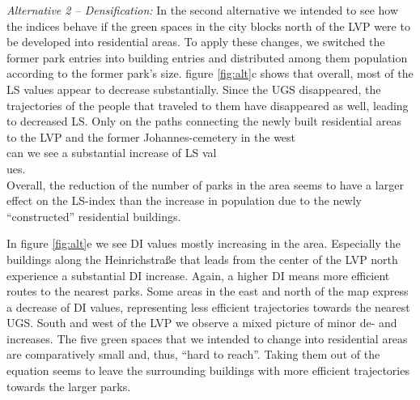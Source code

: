 \documentclass[10pt]{article}
\begin{document}
\textit{Alternative 2 – Densification:} In the second alternative we intended to see how the indices behave if the green spaces in the city blocks north of the LVP were to be developed into residential areas.
To apply these changes, we switched the former park entries into building entries and distributed among them population according to the former park’s size.
figure \ref{fig:alt}c shows that overall, most of the LS values appear to decrease substantially. 
Since the UGS disappeared, the trajectories of the people that traveled to them have disappeared as well, leading to decreased LS.
Only on the paths connecting the newly built residential areas to the LVP and the former Johannes-cemetery in the west\\
 can we see a substantial increase of LS val\\
 ues.\\
 
Overall, the reduction of the number of parks in the area seems to have a larger effect on the LS-index than the increase in population due to the newly “constructed” residential buildings. 

In figure \ref{fig:alt}e we see DI values mostly increasing in the area. 
Especially the buildings along the Heinrichstraße that leads from the center of the LVP north experience a substantial DI increase.
Again, a higher DI means more efficient routes to the nearest parks.
Some areas in the east and north of the map express a decrease of DI values, representing less efficient trajectories towards the nearest UGS.
South and west of the LVP we observe a mixed picture of minor de- and increases.
The five green spaces that we intended to change into residential areas are comparatively small and, thus, “hard to reach”.
Taking them out of the equation seems to leave the surrounding buildings with more efficient trajectories towards the larger parks.
\end{document}
